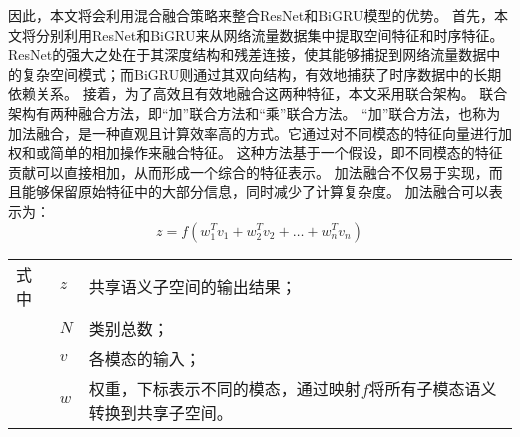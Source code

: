 因此，本文将会利用混合融合策略来整合ResNet和BiGRU模型的优势。
首先，本文将分别利用ResNet和BiGRU来从网络流量数据集中提取空间特征和时序特征。
ResNet的强大之处在于其深度结构和残差连接，使其能够捕捉到网络流量数据中的复杂空间模式；而BiGRU则通过其双向结构，有效地捕获了时序数据中的长期依赖关系。
接着，为了高效且有效地融合这两种特征，本文采用联合架构。
联合架构有两种融合方法，即“加”联合方法和“乘”联合方法。
“加”联合方法，也称为加法融合，是一种直观且计算效率高的方式。它通过对不同模态的特征向量进行加权和或简单的相加操作来融合特征。
这种方法基于一个假设，即不同模态的特征贡献可以直接相加，从而形成一个综合的特征表示。
加法融合不仅易于实现，而且能够保留原始特征中的大部分信息，同时减少了计算复杂度。
加法融合可以表示为：
\begin{equation}
	z = f(w_1^Tv_1 + w_2^Tv_2+ \dots + w_n^Tv_n)
\end{equation}
\begin{flushleft}
	\renewcommand\arraystretch{1.25}
	\begin{tabularx}{\textwidth}{@{}>{\normalsize\rm}l@{\quad}>{\normalsize\rm}l@{——}>{\normalsize\rm}X@{}}
		式中 & $z$ & 共享语义子空间的输出结果；                                              \\
		     & $N$ & 类别总数；                                                              \\
		     & $v$ & 各模态的输入；                                                          \\
		     & $w$ & 权重，下标表示不同的模态，通过映射$f$将所有子模态语义转换到共享子空间。 \\
	\end{tabularx}\vspace{.5ex}
\end{flushleft}


